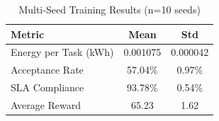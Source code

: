 
\begin{table}[h]
\centering
\caption{Multi-Seed Training Results (n=10 seeds)}
\label{tab:multi_seed}
\begin{tabular}{lcc}
\toprule
\textbf{Metric} & \textbf{Mean} & \textbf{Std} \\
\midrule
Energy per Task (kWh) & 0.001075 & 0.000042 \\
Acceptance Rate & 57.04\% & 0.97\% \\
SLA Compliance & 93.78\% & 0.54\% \\
Average Reward & 65.23 & 1.62 \\
\bottomrule
\end{tabular}
\end{table}
